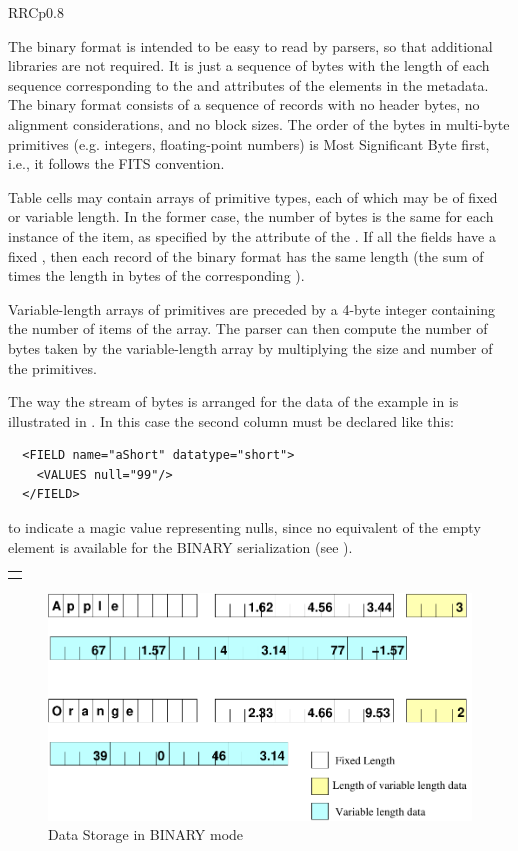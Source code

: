 \begin{tabular}{RRCp{0.8\textwidth}}
\begin{center}
{The binary format is intended to be easy to read by parsers, so
that additional libraries are not required. It is just a sequence of
bytes with the length of each sequence corresponding to the {}
and {} attributes of the {}
elements in the metadata. The binary format consists of a sequence of
records with no header bytes, no alignment considerations, and no block sizes.
The order of the bytes in multi-byte primitives (e.g. integers,
floating-point numbers) is Most Significant Byte first, i.e.,
it follows the FITS convention.

Table cells may contain arrays of primitive types, each of which
may be of fixed or variable length. In the former case, the number of
bytes is the same for each instance of the item, as specified by the
{}
attribute of the {}.
If all the fields have a fixed {},
then each record of the binary format has the same length
(the sum of {}
times the length in bytes of the corresponding {}).

Variable-length arrays of primitives are preceded by a 4-byte integer
containing the number of items of the array.
The parser can then compute the number of bytes taken
by the variable-length array by multiplying the size and number 
of the primitives.

The way the stream of bytes is arranged for the data of the 
example in  is illustrated in 
.
In this case the second column must be declared like this:
\begin{verbatim}
  <FIELD name="aShort" datatype="short">
    <VALUES null="99"/>
  </FIELD>
\end{verbatim}
to indicate a magic value representing nulls, since no equivalent of the
empty  element is available for the BINARY serialization
(see ).

\label{Image2}
\ifhtx\begin{tabular}{c}
\tag{IMG SRC="binary.png" NAME="Image2" ALIGN=LEFT BORDER=0}\end{tabular}
\else\begin{center}
\begin{figure}[htb]
\includegraphics[width=\textwidth]{binary.pdf}
\caption{\label{fig:bin}Data Storage in BINARY mode}
\end{figure}\end{center}
\fi

}
\end{center}
\end{tabular}
